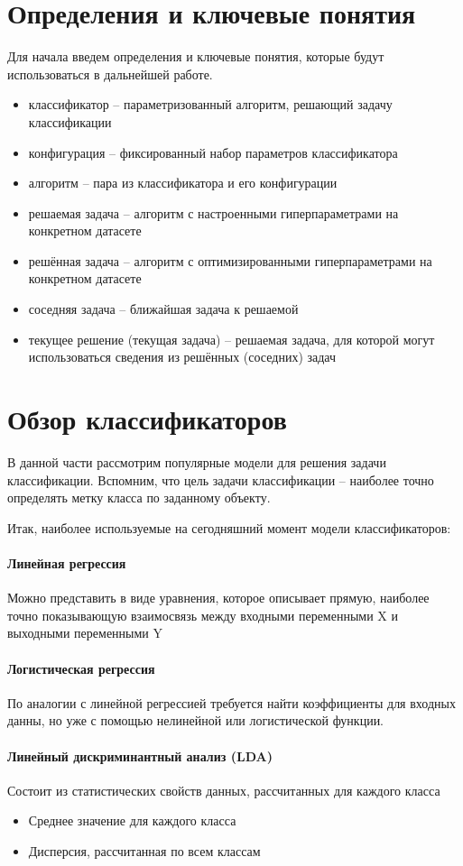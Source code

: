 \documentclass[times,specification,annotation]{itmo-student-thesis}
\begin{document}
	\section{Определения и ключевые понятия}
	Для начала введем определения и ключевые понятия, которые будут использоваться в дальнейшей работе.
	\begin{itemize}
		\item классификатор -- параметризованный алгоритм, решающий задачу классификации
		\item конфигурация -- фиксированный набор параметров классификатора
		\item алгоритм -- пара из классификатора и его конфигурации 
		\item решаемая задача -- алгоритм с настроенными гиперпараметрами на конкретном датасете
		\item решённая задача -- алгоритм с оптимизированными гиперпараметрами на конкретном датасете
		\item соседняя задача -- ближайшая задача к решаемой
		\item текущее решение (текущая задача) -- решаемая задача, для которой могут использоваться сведения из решённых (соседних) задач
	\end{itemize}
	\section{Обзор классификаторов}
	В данной части рассмотрим популярные модели для решения задачи классификации. Вспомним, что цель задачи классификации -- наиболее точно определять метку класса по заданному объекту. \par
	Итак, наиболее используемые на сегодняшний момент модели классификаторов:
	
	\paragraph{Линейная регрессия} Можно представить в виде уравнения, которое описывает прямую, наиболее точно показывающую взаимосвязь между входными переменными X и выходными переменными Y
	\paragraph{Логистическая регрессия} По аналогии с линейной регрессией требуется найти коэффициенты для входных данны, но уже с помощью нелинейной или логистической функции.
	\paragraph{Линейный дискриминантный анализ (LDA)} Состоит из статистических свойств данных, рассчитанных для каждого класса
	\begin{itemize}
		\item Среднее значение для каждого класса
		\item Дисперсия, рассчитанная по всем классам
	\end{itemize}
\end{document}
